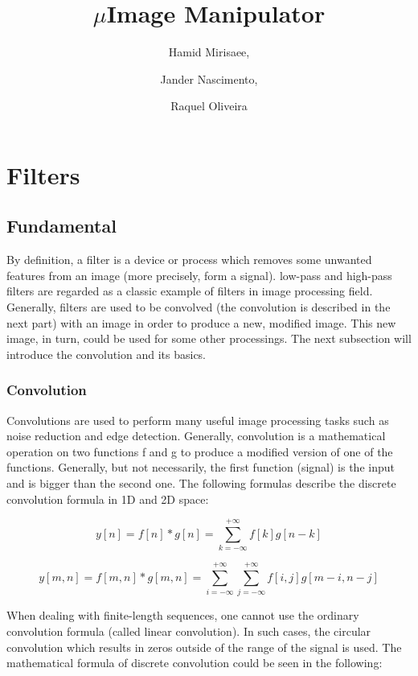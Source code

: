 \documentclass{article}
\begin{document}
\title{$\mu$Image Manipulator}

\author{Hamid Mirisaee,
\and Jander Nascimento, 
\and Raquel Oliveira}

\maketitle

\tableofcontents

\section{Filters}

	\subsection{Fundamental}

		By definition, a filter is a device or process which removes some unwanted features from an image (more precisely, form a signal).
		low-pass and high-pass filters are regarded as a classic example of filters in image processing field. Generally, filters are used to be convolved 
		(the convolution is described in the next part) with an image in order to produce a new, modified image. This new image, in turn, could
		be used for some other processings. The next subsection will introduce the convolution and its basics.
		
		\subsubsection{Convolution}

			Convolutions are used to perform many useful image processing tasks such as noise reduction and edge detection. Generally,
			convolution is a mathematical operation on two functions f and g to produce a modified version of one of the functions.
			Generally, but not necessarily, the first function (signal) is the input and is bigger than the second one.
			The following formulas describe the discrete convolution formula in 1D and 2D space:


			\[y[n] = f[n]*g[n] = \sum_{k=-\infty}^{+\infty} f[k]g[n-k]\]

			\[y[m,n] = f[m,n]*g[m,n] = \sum_{i=-\infty}^{+\infty}\sum_{j=-\infty}^{+\infty}f[i,j]g[m-i,n-j]\]


			
			When dealing with finite-length sequences, one cannot use the ordinary convolution formula (called linear convolution).
			In such cases, the circular convolution which results in zeros outside of the range of the signal is used. The mathematical formula of discrete 
			convolution could be seen in the following:
\end{document}
